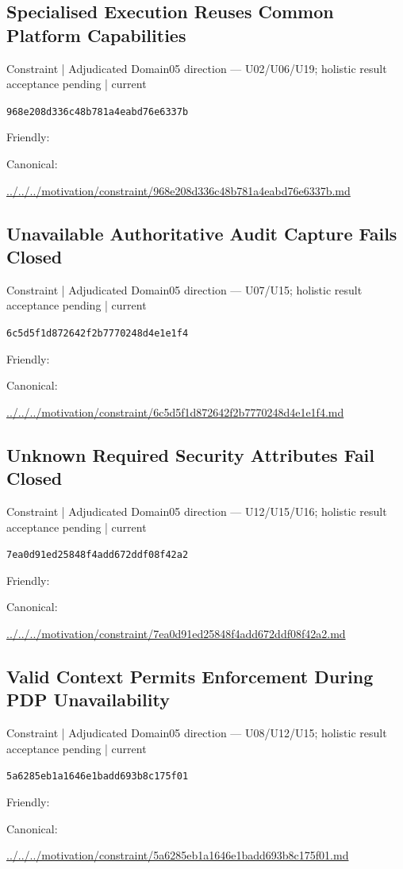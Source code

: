 \documentclass[10pt,a4paper]{article}
\begin{document}
\subsection*{Specialised Execution Reuses Common Platform Capabilities}
{\small Constraint | Adjudicated Domain05 direction — U02/U06/U19; holistic result acceptance pending | current}\par
\texttt{968e208d336c48b781a4eabd76e6337b}\par
Friendly: \par
Canonical: \par
{\footnotesize\url{../../../motivation/constraint/968e208d336c48b781a4eabd76e6337b.md}}\par
\subsection*{Unavailable Authoritative Audit Capture Fails Closed}
{\small Constraint | Adjudicated Domain05 direction — U07/U15; holistic result acceptance pending | current}\par
\texttt{6c5d5f1d872642f2b7770248d4e1e1f4}\par
Friendly: \par
Canonical: \par
{\footnotesize\url{../../../motivation/constraint/6c5d5f1d872642f2b7770248d4e1e1f4.md}}\par
\subsection*{Unknown Required Security Attributes Fail Closed}
{\small Constraint | Adjudicated Domain05 direction — U12/U15/U16; holistic result acceptance pending | current}\par
\texttt{7ea0d91ed25848f4add672ddf08f42a2}\par
Friendly: \par
Canonical: \par
{\footnotesize\url{../../../motivation/constraint/7ea0d91ed25848f4add672ddf08f42a2.md}}\par
\subsection*{Valid Context Permits Enforcement During PDP Unavailability}
{\small Constraint | Adjudicated Domain05 direction — U08/U12/U15; holistic result acceptance pending | current}\par
\texttt{5a6285eb1a1646e1badd693b8c175f01}\par
Friendly: \par
Canonical: \par
{\footnotesize\url{../../../motivation/constraint/5a6285eb1a1646e1badd693b8c175f01.md}}\par
\end{document}
